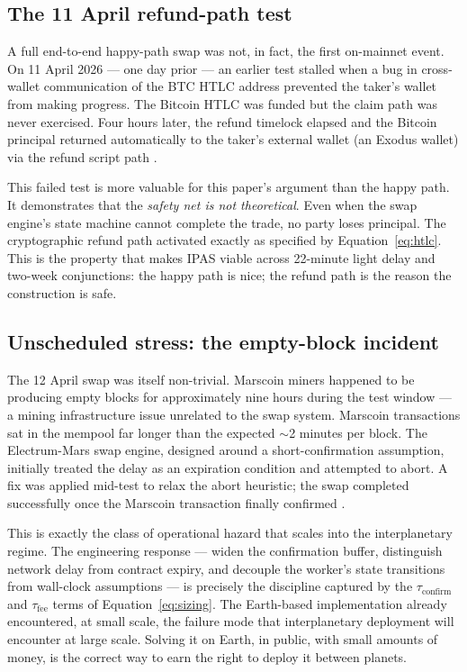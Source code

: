 \documentclass[11pt]{article}
\begin{document}
\subsection{The 11 April refund-path test}

A full end-to-end happy-path swap was not, in fact, the first on-mainnet event. On 11 April 2026 --- one day prior --- an earlier test stalled when a bug in cross-wallet communication of the BTC HTLC address prevented the taker's wallet from making progress. The Bitcoin HTLC was funded but the claim path was never exercised. Four hours later, the refund timelock elapsed and the Bitcoin principal returned automatically to the taker's external wallet (an Exodus wallet) via the refund script path \citep{marscoin2026firstswap}.

This failed test is more valuable for this paper's argument than the happy path. It demonstrates that the \emph{safety net is not theoretical}. Even when the swap engine's state machine cannot complete the trade, no party loses principal. The cryptographic refund path activated exactly as specified by Equation~\ref{eq:htlc}. This is the property that makes IPAS viable across 22-minute light delay and two-week conjunctions: the happy path is nice; the refund path is the reason the construction is safe.

\subsection{Unscheduled stress: the empty-block incident}

The 12 April swap was itself non-trivial. Marscoin miners happened to be producing empty blocks for approximately nine hours during the test window --- a mining infrastructure issue unrelated to the swap system. Marscoin transactions sat in the mempool far longer than the expected $\sim$2 minutes per block. The Electrum-Mars swap engine, designed around a short-confirmation assumption, initially treated the delay as an expiration condition and attempted to abort. A fix was applied mid-test to relax the abort heuristic; the swap completed successfully once the Marscoin transaction finally confirmed \citep{marscoin2026firstswap}.

This is exactly the class of operational hazard that scales into the interplanetary regime. The engineering response --- widen the confirmation buffer, distinguish network delay from contract expiry, and decouple the worker's state transitions from wall-clock assumptions --- is precisely the discipline captured by the $\tau_{\text{confirm}}$ and $\tau_{\text{fee}}$ terms of Equation~\ref{eq:sizing}. The Earth-based implementation already encountered, at small scale, the failure mode that interplanetary deployment will encounter at large scale. Solving it on Earth, in public, with small amounts of money, is the correct way to earn the right to deploy it between planets.
\end{document}
